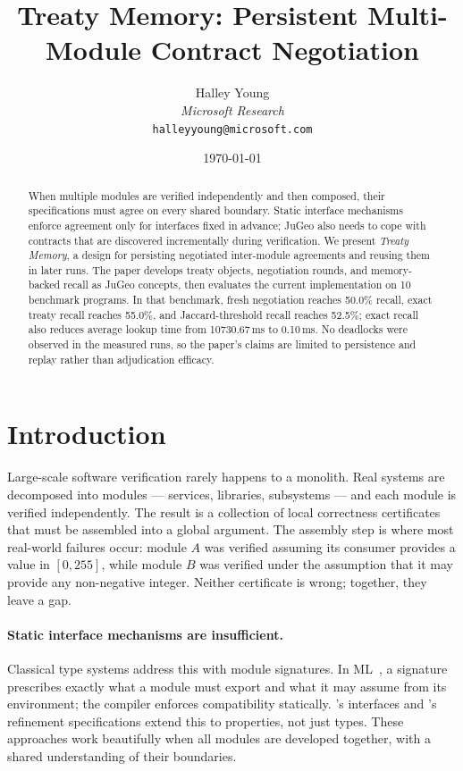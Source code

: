 \documentclass[11pt]{article}
\title{\textbf{Treaty Memory: Persistent Multi-Module Contract Negotiation}}
\author{%
  Halley Young\\
  \textit{Microsoft Research}\\
  \texttt{halleyyoung@microsoft.com}
}
\date{\today}
\begin{document}
\maketitle

\begin{abstract}
When multiple modules are verified independently and then composed,
their specifications must agree on every shared boundary.  Static
interface mechanisms enforce agreement only for interfaces fixed in
advance; JuGeo also needs to cope with contracts that are discovered
incrementally during verification.  We present \emph{Treaty Memory}, a
design for persisting negotiated inter-module agreements and reusing
them in later runs.  The paper develops treaty objects, negotiation
rounds, and memory-backed recall as JuGeo concepts, then evaluates the
current implementation on 10 benchmark programs.  In that benchmark,
fresh negotiation reaches 50.0\% recall, exact treaty recall reaches
55.0\%, and Jaccard-threshold recall reaches 52.5\%; exact recall also
reduces average lookup time from 10730.67\,ms to 0.10\,ms.  No
deadlocks were observed in the measured runs, so the paper's claims are
limited to persistence and replay rather than adjudication efficacy.
\end{abstract}

\newpage

\section{Introduction}\label{sec:intro}

Large-scale software verification rarely happens to a monolith.
Real systems are decomposed into modules — services, libraries,
subsystems — and each module is verified independently.  The result is
a collection of local correctness certificates that must be assembled
into a global argument.  The assembly step is where most real-world
failures occur: module $A$ was verified assuming its consumer provides
a value in $[0, 255]$, while module $B$ was verified under the
assumption that it may provide any non-negative integer.  Neither
certificate is wrong; together, they leave a gap.

\paragraph{Static interface mechanisms are insufficient.}
Classical type systems address this with module signatures.
In ML~\cite{milner1997,leroy1994}, a signature prescribes exactly what a
module must export and what it may assume from its environment; the
compiler enforces compatibility statically.  \Fstar{}'s interfaces and
\Dafny{}'s refinement specifications extend this to properties, not
just types.  These approaches work beautifully when all modules are
developed together, with a shared understanding of their boundaries.
\end{document}
